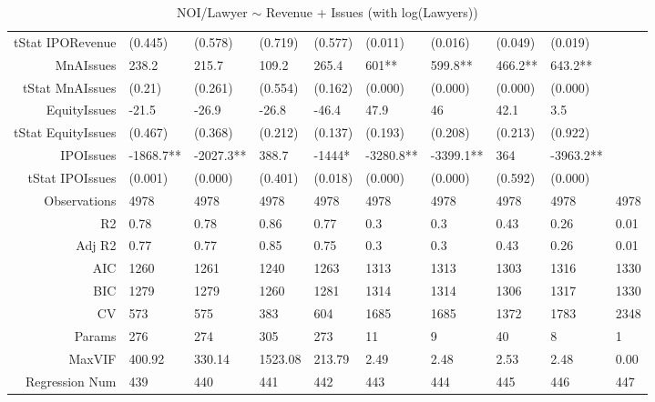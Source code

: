 \begin{table}[ht]
\begin{tabular}{rlllllllll}
  tStat IPORevenue & (0.445) & (0.578) & (0.719) & (0.577) & (0.011) & (0.016) & (0.049) & (0.019) &  \\ 
  MnAIssues & 238.2 & 215.7 & 109.2 & 265.4 & 601** & 599.8** & 466.2** & 643.2** &  \\ 
  tStat MnAIssues & (0.21) & (0.261) & (0.554) & (0.162) & (0.000) & (0.000) & (0.000) & (0.000) &  \\ 
  EquityIssues & -21.5 & -26.9 & -26.8 & -46.4 & 47.9 & 46 & 42.1 & 3.5 &  \\ 
  tStat EquityIssues & (0.467) & (0.368) & (0.212) & (0.137) & (0.193) & (0.208) & (0.213) & (0.922) &  \\ 
  IPOIssues & -1868.7** & -2027.3** & 388.7 & -1444* & -3280.8** & -3399.1** & 364 & -3963.2** &  \\ 
  tStat IPOIssues & (0.001) & (0.000) & (0.401) & (0.018) & (0.000) & (0.000) & (0.592) & (0.000) &  \\ 
  Observations & 4978 & 4978 & 4978 & 4978 & 4978 & 4978 & 4978 & 4978 & 4978 \\ 
  R2 & 0.78 & 0.78 & 0.86 & 0.77 & 0.3 & 0.3 & 0.43 & 0.26 & 0.01 \\ 
  Adj R2 & 0.77 & 0.77 & 0.85 & 0.75 & 0.3 & 0.3 & 0.43 & 0.26 & 0.01 \\ 
  AIC & 1260 & 1261 & 1240 & 1263 & 1313 & 1313 & 1303 & 1316 & 1330 \\ 
  BIC & 1279 & 1279 & 1260 & 1281 & 1314 & 1314 & 1306 & 1317 & 1330 \\ 
  CV & 573 & 575 & 383 & 604 & 1685 & 1685 & 1372 & 1783 & 2348 \\ 
  Params & 276 & 274 & 305 & 273 & 11 & 9 & 40 & 8 & 1 \\ 
  MaxVIF & 400.92 & 330.14 & 1523.08 & 213.79 & 2.49 & 2.48 & 2.53 & 2.48 & 0.00 \\ 
  Regression Num & 439 & 440 & 441 & 442 & 443 & 444 & 445 & 446 & 447 \\ 
   \hline
\end{tabular}
\caption{NOI/Lawyer $\sim$ Revenue + Issues (with log(Lawyers))} 
\end{table}
